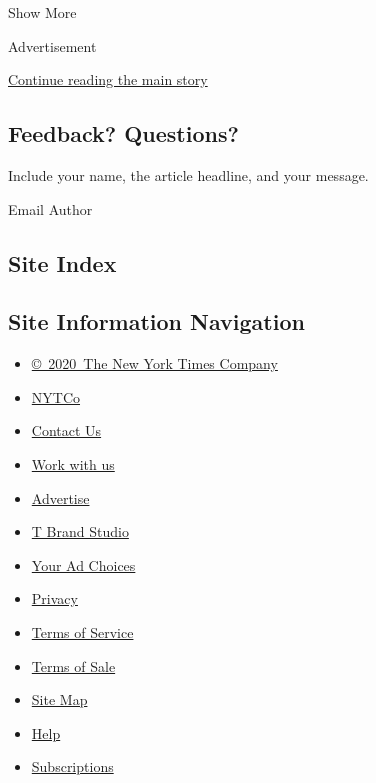 Show More

Advertisement

\protect\hyperlink{after-mid2}{Continue reading the main story}

\hypertarget{feedback-questions}{%
\subsection{Feedback? Questions?}\label{feedback-questions}}

Include your name, the article headline, and your message.

Email Author

\hypertarget{site-index}{%
\subsection{Site Index}\label{site-index}}

\hypertarget{site-information-navigation}{%
\subsection{Site Information
Navigation}\label{site-information-navigation}}

\begin{itemize}
\tightlist
\item
  \href{https://help.nytimes.com/hc/en-us/articles/115014792127-Copyright-notice}{©~2020~The
  New York Times Company}
\end{itemize}

\begin{itemize}
\tightlist
\item
  \href{https://www.nytco.com/}{NYTCo}
\item
  \href{https://help.nytimes.com/hc/en-us/articles/115015385887-Contact-Us}{Contact
  Us}
\item
  \href{https://www.nytco.com/careers/}{Work with us}
\item
  \href{https://nytmediakit.com/}{Advertise}
\item
  \href{http://www.tbrandstudio.com/}{T Brand Studio}
\item
  \href{https://www.nytimes.com/privacy/cookie-policy\#how-do-i-manage-trackers}{Your
  Ad Choices}
\item
  \href{https://www.nytimes.com/privacy}{Privacy}
\item
  \href{https://help.nytimes.com/hc/en-us/articles/115014893428-Terms-of-service}{Terms
  of Service}
\item
  \href{https://help.nytimes.com/hc/en-us/articles/115014893968-Terms-of-sale}{Terms
  of Sale}
\item
  \href{https://spiderbites.nytimes.com}{Site Map}
\item
  \href{https://help.nytimes.com/hc/en-us}{Help}
\item
  \href{https://www.nytimes.com/subscription?campaignId=37WXW}{Subscriptions}
\end{itemize}
